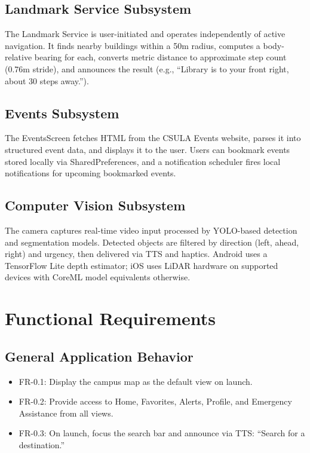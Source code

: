 \documentclass[12pt]{article}
\begin{document}
\subsection{Landmark Service Subsystem}
The Landmark Service is user-initiated and operates independently of active navigation. It finds nearby buildings within a 50m radius, computes a body-relative bearing for each, converts metric distance to approximate step count (0.76m stride), and announces the result (e.g., ``Library is to your front right, about 30 steps away.'').

\subsection{Events Subsystem}
The EventsScreen fetches HTML from the CSULA Events website, parses it into structured event data, and displays it to the user. Users can bookmark events stored locally via SharedPreferences, and a notification scheduler fires local notifications for upcoming bookmarked events.

\subsection{Computer Vision Subsystem}
The camera captures real-time video input processed by YOLO-based detection and segmentation models. Detected objects are filtered by direction (left, ahead, right) and urgency, then delivered via TTS and haptics. Android uses a TensorFlow Lite depth estimator; iOS uses LiDAR hardware on supported devices with CoreML model equivalents otherwise.

\section{Functional Requirements}

\subsection{General Application Behavior}
\begin{itemize}
    \item FR-0.1: Display the campus map as the default view on launch.
    \item FR-0.2: Provide access to Home, Favorites, Alerts, Profile, and Emergency Assistance from all views.
    \item FR-0.3: On launch, focus the search bar and announce via TTS: ``Search for a destination.''
\end{itemize}
\end{document}
